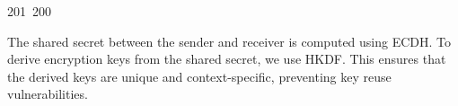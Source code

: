 201~200~\documentclass{article}
\begin{document}
	                                                                                                                                                                                                                                                                                                	                                                                                                                                        	    	                                                                                                	                                                                                                                                                                                                                                                                                                                                	                                                                        	                                                                        	                                                                                                                                        	                                                                                                                                                                                                            The shared secret between the sender and receiver is computed using ECDH. To derive encryption keys from the shared secret, we use HKDF. This ensures that the derived keys are unique and context-specific, preventing key reuse vulnerabilities.
\end{document}
